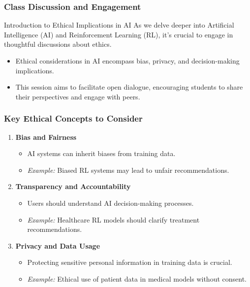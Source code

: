 \documentclass[aspectratio=169]{beamer}
\begin{document}
\begin{frame}[fragile]
    \frametitle{Class Discussion and Engagement}
    \begin{block}{Introduction to Ethical Implications in AI}
        As we delve deeper into Artificial Intelligence (AI) and Reinforcement Learning (RL), it's crucial to engage in thoughtful discussions about ethics. 
        \begin{itemize}
            \item Ethical considerations in AI encompass bias, privacy, and decision-making implications.
            \item This session aims to facilitate open dialogue, encouraging students to share their perspectives and engage with peers.
        \end{itemize}
    \end{block}
\end{frame}

\begin{frame}[fragile]
    \frametitle{Key Ethical Concepts to Consider}
    \begin{enumerate}
        \item \textbf{Bias and Fairness}
            \begin{itemize}
                \item AI systems can inherit biases from training data.
                \item \textit{Example:} Biased RL systems may lead to unfair recommendations.
            \end{itemize}
        \item \textbf{Transparency and Accountability}
            \begin{itemize}
                \item Users should understand AI decision-making processes.
                \item \textit{Example:} Healthcare RL models should clarify treatment recommendations.
            \end{itemize}
        \item \textbf{Privacy and Data Usage}
            \begin{itemize}
                \item Protecting sensitive personal information in training data is crucial.
                \item \textit{Example:} Ethical use of patient data in medical models without consent.
            \end{itemize}
    \end{enumerate}
\end{frame}
\end{document}
